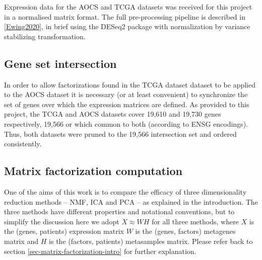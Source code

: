 \documentclass[draft, tikz, 12pt,a4paper,oneside,fleqn]{article}
\begin{document}
Expression data for the AOCS and TCGA datasets was received for this project in a normalised matrix format.  The full pre-processing pipeline is described in \ref{Ewing2020}, in brief using the DESeq2 package with normalization by variance stabilizing transformation.   

\subsection{Gene set intersection}
\label{sec:gene-set-intersection}

In order to allow factorizations found in the TCGA dataset dataset to be applied to the AOCS dataset it is necessary (or at least convenient) to synchronize the set of genes over which the expression matrices are defined.   As provided to this project, the TCGA and AOCS datasets cover 19,610 and 19,730 genes respectively, 19,566 or which common to both (according to ENSG encodings).  Thus, both datasets were pruned to the 19,566 intersection set and ordered consistently.

\subsection{Matrix factorization computation}
One of the aims of this work is to compare the efficacy of three dimensionality reduction methods -- NMF, ICA and PCA -- as explained in the introduction.   The three methods have different properties and notational conventions, but to simplify the discussion here we adopt $X \approx W H$ for all three methods, where $X$ is the (genes, patients) expression matrix  $W$ is the (genes, factors) metagenes matrix and $H$ is the (factors, patients) metasamples matrix.   Please refer back to section \ref{sec-matrix-factorization-intro} for further explanation.
\end{document}
